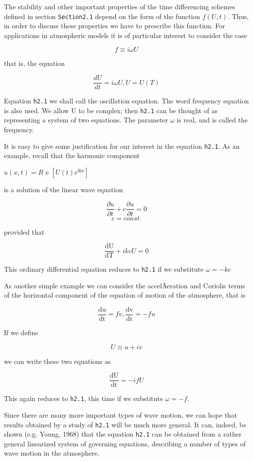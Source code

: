 The stability and other important properties of the time differencing
schemes defined in section \texttt{Section2.1} depend on the form of the
function \(f\left( U,t \right)\). Thus, in order to discuss these
properties we have to prescribe this function. For applications in
atmospheric models it is of particular interest to consider the case

\[f \equiv i\omega U\]

that is, the equation

\[\frac{dU}{dt} = i\omega U, U = U\left( T \right)\]

Equation \texttt{h2.1} we shall call the oscillation equation. The word
frequency equation is also used. We allow U to be complex; then
\texttt{h2.1} can be thought of as representing a system of two
equations. The parameter \(\omega\) is real, and is called the
frequency.

It is easy to give some justification for our interest in the equation
\texttt{h2.1}. As an example, recall that the harmonic component

\(u\left( x,t \right) = R\) e
\(\left\lbrack U\left( t \right)e^{\text{ikx}} \right\rbrack\)

is a solution of the linear wave equation

\[\frac{\partial u}{\partial t} + c\frac{\partial u}{\partial t} = 0\]\[c = const.\]

provided that

\[\frac{\text{dU}}{\text{dT}} + ikcU = 0\]

This ordinary differential equation reduces to \texttt{h2.1} if we
substitute \(\omega = - kc\)

As another simple example we can consider the accelÂ­eration and Coriolis
terms of the horizontal component of the equation of motion of the
atmosphere, that is

\[\frac{\text{du}}{\text{dt}} = fv,\frac{\text{dv}}{\text{dt}} = - fu\]

If we define

\[U \equiv u + iv\]

we can write these two equations as

\[\frac{\text{dU}}{\text{dt}} = - ifU\]

This again reduces to \texttt{h2.1}, this time if we substitute
\(\omega = - f\).

Since there are many more important types of wave motion, we can hope
that results obtained by a study of \texttt{h2.1} will be much more
general. It can, indeed, be shown (e.g. Young, 1968) that the equation
\texttt{h2.1} can be obtained from a rather general linearized system of
governing equations, describing a number of types of wave motion in the
atmosphere.

